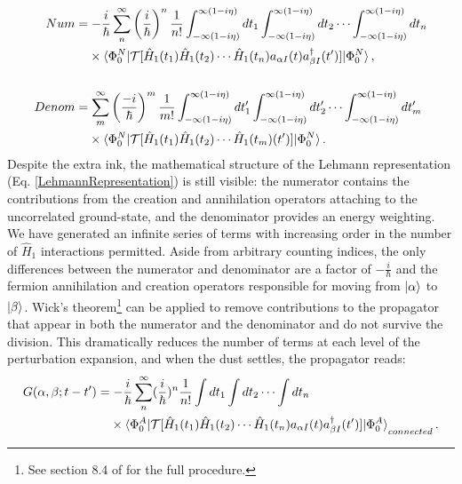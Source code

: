 \begin{equation*}
    \begin{split}
        Num & = -\frac{i}{\hbar}\sum^{\infty}_{n}\left(\frac{i}{\hbar}\right)^{n}\frac{1}{n!}
    \int_{-\infty(1-i\eta)}^{\infty(1-i\eta)} dt_{1}
    \int_{-\infty(1-i\eta)}^{\infty(1-i\eta)} dt_{2} \cdots
    \int_{-\infty(1-i\eta)}^{\infty(1-i\eta)} dt_{n}\\
    & \phantom{ {}= } \times \braket{\Phi^{N}_{0}|\mathcal{T}[\hat{H}_{1}(t_{1})
    \hat{H}_{1}(t_{2}) \cdots \hat{H}_{1}(t_{n})a_{\alpha I}(t)a^{\dagger}_{\beta
    I}(t')]|\Phi^{N}_{0}},\\\\
    Denom & = \sum^{\infty}_{m}\left(\frac{-i}{\hbar}\right)^{m}\frac{1}{m!}
        \int_{-\infty(1-i\eta)}^{\infty(1-i\eta)} dt'_{1}
        \int_{-\infty(1-i\eta)}^{\infty(1-i\eta)} dt'_{2} \cdots
        \int_{-\infty(1-i\eta)}^{\infty(1-i\eta)} dt'_{m}\\
        & \phantom{ {}= } \times \braket{\Phi^{N}_{0}|
        \mathcal{T}[\hat{H}_{1}(t_{1})
        \hat{H}_{1}(t_{2}) \cdots \hat{H}_{1}(t_{m})(t')]|\Phi^{N}_{0}}.
    \end{split}
\end{equation*}
Despite the extra ink, the mathematical structure of the Lehmann
representation (Eq. \ref{LehmannRepresentation}) is still visible: the numerator contains
the contributions from the creation and annihilation operators attaching to the uncorrelated
ground-state, and the denominator provides an energy weighting. We have generated an infinite
series of terms with increasing order in the number of $\hat{H}_{1}$ interactions permitted.
Aside from arbitrary counting indices,
the only differences between the numerator and denominator are a
factor of $-\frac{i}{\hbar}$ and the fermion annihilation and creation operators
responsible for moving from $\ket{\alpha}$ to $\ket{\beta}$. Wick's
theorem\footnote{See section 8.4 of \cite{MBTE}
for the full procedure.} can be applied to remove contributions to the propagator
that appear in both the numerator and the denominator and do not survive the
division. This dramatically
reduces the number of terms at each level of the perturbation expansion, and when the dust settles,
the propagator reads:
\begin{equation} \label{ManyBodySPPropagatorConnected}
    \begin{split}
    G(\alpha, \beta; t-t') & =
    -\frac{i}{\hbar}\sum^{\infty}_{n}(\frac{i}{\hbar})^{n}
    \frac{1}{n!}\int dt_{1} \int dt_{2} \cdots \int dt_{n}\\
    & \phantom{ {}= } \times \braket{\Phi^{A}_{0}|
    \mathcal{T}[\hat{H}_{1}(t_{1})
    \hat{H}_{1}(t_{2}) \cdots
    \hat{H}_{1}(t_{n})a_{{\alpha}I}(t)a^{\dagger}_{{\beta}I}(t')]|\Phi^{A}_{0}}_{connected}.
\end{split}
\end{equation}
